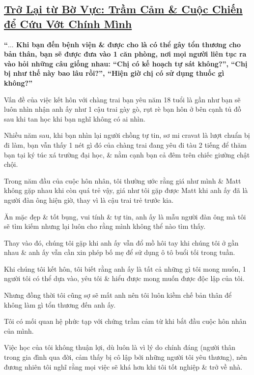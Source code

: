 \documentclass{article}
\begin{document}

\subsection{\href{http://tramdoc.vn/tin-tuc/tro-lai-tu-bo-vuc-tram-cam-va-cuoc-chien-de-cuu-vot-chinh-minh-nYDm9W.html}{Trở Lại từ Bờ Vực: Trầm Cảm \& Cuộc Chiến để Cứu Vớt Chính Mình}}

\textbf{``$\ldots$ Khi bạn đến bệnh viện \& được cho là có thể gây tổn thương cho bản thân, bạn sẽ được đưa vào 1 căn phòng, nơi mọi người liên tục ra vào hỏi những câu giống nhau: ``Chị có kế hoạch tự sát không?'', ``Chị bị như thế này bao lâu rồi?'', ``Hiện giờ chị có sử dụng thuốc gì không?''}

%
Vấn đề của việc kết hôn với chàng trai bạn yêu năm 18 tuổi là gần như bạn sẽ luôn nhìn nhận anh ấy như 1 cậu trai gày gò, rụt rè bạn hôn ở bên cạnh tủ đồ sau khi tan học khi bạn nghĩ không có ai nhìn.

Nhiều năm sau, khi bạn nhìn lại người chồng tự tin, sơ mi cravat là lượt chuẩn bị đi làm, bạn vẫn thấy 1 nét gì đó của chàng trai đang yêu đi tàu 2 tiếng để thăm bạn tại ký túc xá trường đại học, \& nằm cạnh bạn cả đêm trên chiếc giường chật chội.

%
Trong năm đầu của cuộc hôn nhân, tôi thường ước rằng giá như mình \& Matt không gặp nhau khi còn quá trẻ vậy, giá như tôi gặp được Matt khi anh ấy đã là người đàn ông hiện giờ, thay vì là cậu trai trẻ trước kia.

Ăn mặc đẹp \& tốt bụng, vui tính \& tự tin, anh ấy là mẫu người đàn ông mà tôi sẽ tìm kiếm nhưng lại luôn cho rằng mình không thể nào tìm thấy.

%
Thay vào đó, chúng tôi gặp khi anh ấy vẫn đổ mồ hôi tay khi chúng tôi ở gần nhau \& anh ấy vẫn cần xin phép bố mẹ để sử dụng ô tô buổi tối trong tuần.

Khi chúng tôi kết hôn, tôi biết rằng anh ấy là tất cả những gì tôi mong muốn, 1 người tôi có thể dựa vào, yêu tôi \& hiểu được mong muốn được độc lập của tôi.

Nhưng đồng thời tôi cũng sợ sẽ mất anh nên tôi luôn kiềm chế bản thân để không làm gì tổn thương đến anh ấy.

%
Tôi có mối quan hệ phức tạp với chứng trầm cảm từ khi bắt đầu cuộc hôn nhân của mình.

Việc học của tôi không thuận lợi, dù luôn là vì lý do chính đáng (người thân trong gia đình qua đời, cảm thấy bị cô lập bởi những người tôi yêu thương), nên đương nhiên tôi nghĩ rằng mọi việc sẽ khá hơn khi tôi tốt nghiệp \& trở về nhà.
\end{document}
